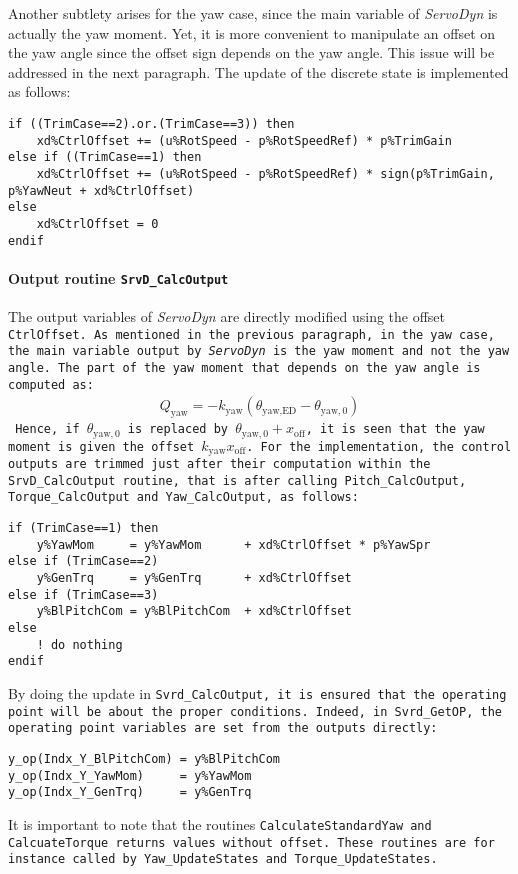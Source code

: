 \documentclass[11pt]{article}
\begin{document}
Another subtlety arises for the yaw case, since the main variable of \textit{ServoDyn} is actually the yaw moment. Yet, it is more convenient to manipulate an offset on the yaw angle since the offset sign depends on the yaw angle. 
This issue will be addressed in the next paragraph.
The update of the discrete state is implemented as follows:
\begin{lstlisting}
if ((TrimCase==2).or.(TrimCase==3)) then
    xd%CtrlOffset += (u%RotSpeed - p%RotSpeedRef) * p%TrimGain 
else if ((TrimCase==1) then
    xd%CtrlOffset += (u%RotSpeed - p%RotSpeedRef) * sign(p%TrimGain, p%YawNeut + xd%CtrlOffset)
else
    xd%CtrlOffset = 0
endif
\end{lstlisting}




\paragraph{Output routine \tt{SrvD\_CalcOutput}}
The output variables of \textit{ServoDyn} are directly modified using the offset \tt{CtrlOffset}.
As mentioned in the previous paragraph, in the yaw case, the main variable output by \textit{ServoDyn} is the yaw moment and not the yaw angle. The part of the yaw moment that depends on the yaw angle is computed as:
\begin{align}
    Q_\text{yaw}= - k_\text{yaw} ( \theta_\text{yaw,ED} - \theta_{\text{yaw},0})
\end{align}
Hence, if $\theta_{\text{yaw},0}$ is replaced by $\theta_{\text{yaw},0}+x_\text{off}$, it is seen that the yaw moment is given the offset $k_\text{yaw} x_\text{off}$.
% 
% 
For the implementation, the control outputs are trimmed just after their computation within the  \tt{SrvD\_CalcOutput} routine, that is after calling \tt{Pitch\_CalcOutput}, \tt{Torque\_CalcOutput} and \tt{Yaw\_CalcOutput}, as follows:
\begin{lstlisting}
if (TrimCase==1) then
    y%YawMom     = y%YawMom      + xd%CtrlOffset * p%YawSpr
else if (TrimCase==2)
    y%GenTrq     = y%GenTrq      + xd%CtrlOffset
else if (TrimCase==3)
    y%BlPitchCom = y%BlPitchCom  + xd%CtrlOffset
else
    ! do nothing
endif
\end{lstlisting}
By doing the update in \tt{Svrd\_CalcOutput}, it is ensured that the operating point will be about the proper conditions. Indeed, in \tt{Svrd\_GetOP}, the operating point variables are set from the outputs directly:
\begin{lstlisting}
y_op(Indx_Y_BlPitchCom) = y%BlPitchCom
y_op(Indx_Y_YawMom)     = y%YawMom 
y_op(Indx_Y_GenTrq)     = y%GenTrq
\end{lstlisting}
It is important to note that the routines \tt{CalculateStandardYaw} and \tt{CalcuateTorque} returns values without offset. These routines are for instance called by  \tt{Yaw\_UpdateStates}  and \tt{Torque\_UpdateStates}.
\end{document}
